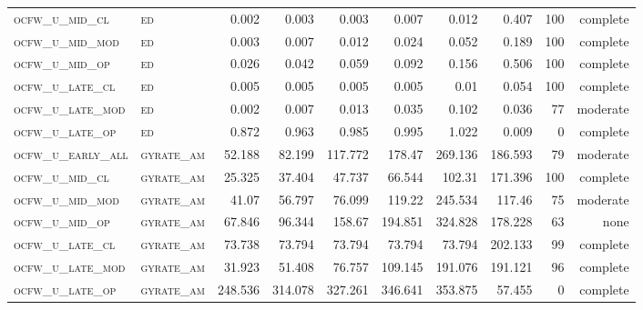 \begin{landscape}
\begin{center}
\begin{footnotesize}
\begin{longtable}{llrrrrr|rrr}
\textsc{ocfw\_u\_mid\_cl   } & \textsc{ed        }    & 0.002    & 0.003    & 0.003    & 0.007    & 0.012     & 0.407         & 100           & complete            \\
\textsc{ocfw\_u\_mid\_mod  } & \textsc{ed        }    & 0.003    & 0.007    & 0.012    & 0.024    & 0.052     & 0.189         & 100           & complete            \\
\textsc{ocfw\_u\_mid\_op   } & \textsc{ed        }    & 0.026    & 0.042    & 0.059    & 0.092    & 0.156     & 0.506         & 100           & complete            \\
\textsc{ocfw\_u\_late\_cl  } & \textsc{ed        }    & 0.005    & 0.005    & 0.005    & 0.005    & 0.01      & 0.054         & 100           & complete            \\
\textsc{ocfw\_u\_late\_mod } & \textsc{ed        }    & 0.002    & 0.007    & 0.013    & 0.035    & 0.102     & 0.036         & 77            & moderate       \\
\textsc{ocfw\_u\_late\_op  } & \textsc{ed        }    & 0.872    & 0.963    & 0.985    & 0.995    & 1.022     & 0.009         & 0             & complete           \\
\textsc{ocfw\_u\_early\_all} & \textsc{gyrate\_am}    & 52.188   & 82.199   & 117.772  & 178.47   & 269.136   & 186.593       & 79            & moderate       \\
\textsc{ocfw\_u\_mid\_cl   } & \textsc{gyrate\_am}    & 25.325   & 37.404   & 47.737   & 66.544   & 102.31    & 171.396       & 100           & complete            \\
\textsc{ocfw\_u\_mid\_mod  } & \textsc{gyrate\_am}    & 41.07    & 56.797   & 76.099   & 119.22   & 245.534   & 117.46        & 75            & moderate       \\
\textsc{ocfw\_u\_mid\_op   } & \textsc{gyrate\_am}    & 67.846   & 96.344   & 158.67   & 194.851  & 324.828   & 178.228       & 63            & none       \\
\textsc{ocfw\_u\_late\_cl  } & \textsc{gyrate\_am}    & 73.738   & 73.794   & 73.794   & 73.794   & 73.794    & 202.133       & 99            & complete       \\
\textsc{ocfw\_u\_late\_mod } & \textsc{gyrate\_am}    & 31.923   & 51.408   & 76.757   & 109.145  & 191.076   & 191.121       & 96            & complete       \\
\textsc{ocfw\_u\_late\_op  } & \textsc{gyrate\_am}    & 248.536  & 314.078  & 327.261  & 346.641  & 353.875   & 57.455        & 0             & complete           \\

\end{longtable}
\end{footnotesize}
\end{center}
\end{landscape}
